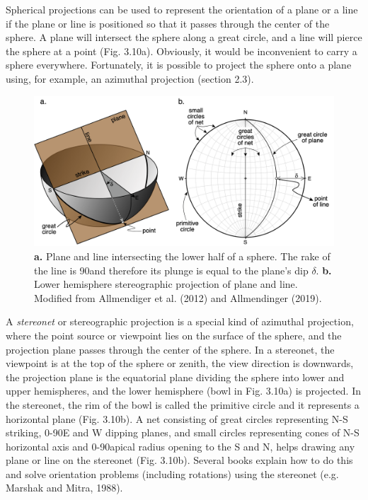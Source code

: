 \documentclass[a4paper , 12pt]{book}
\begin{document}
Spherical projections can be used to represent the orientation of a plane or a line if the plane or line is positioned so that it passes through the center of the sphere. A plane will intersect the sphere along a great circle, and a line will pierce the sphere at a point (Fig. 3.10a). Obviously, it would be inconvenient to carry a sphere everywhere. Fortunately, it is possible to project the sphere onto a plane using, for example, an azimuthal projection (section 2.3).

\begin{figure}[ht]
    \centering
    \includegraphics[width=13cm]{Figures/ch3f10.png}
    \caption{\textbf{a.} Plane and line intersecting the lower half of a sphere. The rake of the line is 90\degree and therefore its plunge is equal to the plane’s dip $\delta$. \textbf{b.} Lower hemisphere stereographic projection of plane and line. Modified from Allmendiger et al. (2012) and Allmendinger (2019).}
\end{figure}

A \textit{stereonet} or stereographic projection is a special kind of azimuthal projection, where the point source or viewpoint lies on the surface of the sphere, and the projection plane passes through the center of the sphere. In a stereonet, the viewpoint is at the top of the sphere or zenith, the view direction is downwards, the projection plane is the equatorial plane dividing the sphere into lower and upper hemispheres, and the lower hemisphere (bowl in Fig. 3.10a) is projected. In the stereonet, the rim of the bowl is called the primitive circle and it represents a horizontal plane (Fig. 3.10b). A net consisting of great circles representing N-S striking, 0-90\degree E and W dipping planes, and small circles representing cones of N-S horizontal axis and 0-90\degree apical radius opening to the S and N, helps drawing any plane or line on the stereonet (Fig. 3.10b). Several books explain how to do this and solve orientation problems (including rotations) using the stereonet (e.g. Marshak and Mitra, 1988).
\end{document}
